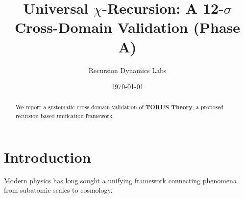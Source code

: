 \documentclass{article}
\title{Universal $\chi$-Recursion: A 12-$\sigma$ Cross-Domain Validation (Phase A)}
\author{Recursion Dynamics Labs}
\date{\today}
\begin{document}
\maketitle
\begin{abstract}
We report a systematic cross-domain validation of \textbf{TORUS Theory}, a proposed recursion-based unification framework.
\end{abstract}

\section{Introduction}\label{sec:intro}
Modern physics has long sought a unifying framework connecting phenomena from subatomic scales to cosmology.
\end{document}
